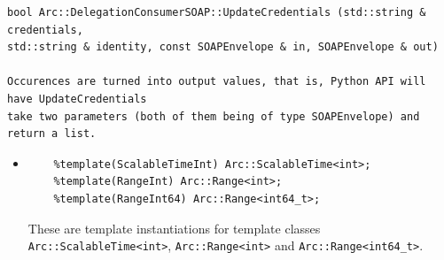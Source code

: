 \documentclass{article}
\begin{document}
\begin{flushleft}
\begin{itemize}
{\begin{example}
\begin{verbatim}
bool Arc::DelegationConsumerSOAP::UpdateCredentials (std::string & credentials,
std::string & identity, const SOAPEnvelope & in, SOAPEnvelope & out)

Occurences are turned into output values, that is, Python API will have UpdateCredentials 
take two parameters (both of them being of type SOAPEnvelope) and return a list.
\end{verbatim}
    \end{example}
  }
\end{itemize}
\begin{itemize}
  \item{ \begin{verbatim}
    %template(ScalableTimeInt) Arc::ScalableTime<int>;
    %template(RangeInt) Arc::Range<int>;
    %template(RangeInt64) Arc::Range<int64_t>;
  \end{verbatim}
  }
  These are template instantiations for template classes \verb$Arc::ScalableTime<int>$, 
  \verb$Arc::Range<int>$ and \verb$Arc::Range<int64_t>$.
\end{itemize}
\end{flushleft}
\end{document}
